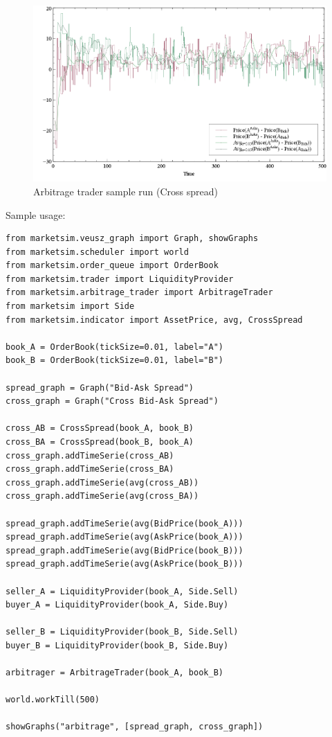 \documentclass[a4paper,11pt]{article}
\begin{document}
\begin{figure}[htbp]
\centering
\includegraphics[width=1\linewidth]{Figures/Arbitrage_Cross_Spread.PNG}
\caption{Arbitrage trader sample run (Cross spread)}
\label{fig:ArbCross}
\end{figure}

Sample usage:

\begin{verbatim}
from marketsim.veusz_graph import Graph, showGraphs
from marketsim.scheduler import world
from marketsim.order_queue import OrderBook
from marketsim.trader import LiquidityProvider
from marketsim.arbitrage_trader import ArbitrageTrader
from marketsim import Side
from marketsim.indicator import AssetPrice, avg, CrossSpread

book_A = OrderBook(tickSize=0.01, label="A")
book_B = OrderBook(tickSize=0.01, label="B")

spread_graph = Graph("Bid-Ask Spread")
cross_graph = Graph("Cross Bid-Ask Spread")

cross_AB = CrossSpread(book_A, book_B)
cross_BA = CrossSpread(book_B, book_A)
cross_graph.addTimeSerie(cross_AB)
cross_graph.addTimeSerie(cross_BA)
cross_graph.addTimeSerie(avg(cross_AB))
cross_graph.addTimeSerie(avg(cross_BA))

spread_graph.addTimeSerie(avg(BidPrice(book_A)))
spread_graph.addTimeSerie(avg(AskPrice(book_A)))
spread_graph.addTimeSerie(avg(BidPrice(book_B)))
spread_graph.addTimeSerie(avg(AskPrice(book_B)))

seller_A = LiquidityProvider(book_A, Side.Sell)
buyer_A = LiquidityProvider(book_A, Side.Buy)

seller_B = LiquidityProvider(book_B, Side.Sell)
buyer_B = LiquidityProvider(book_B, Side.Buy)

arbitrager = ArbitrageTrader(book_A, book_B)

world.workTill(500)

showGraphs("arbitrage", [spread_graph, cross_graph])
\end{verbatim}
\end{document}

